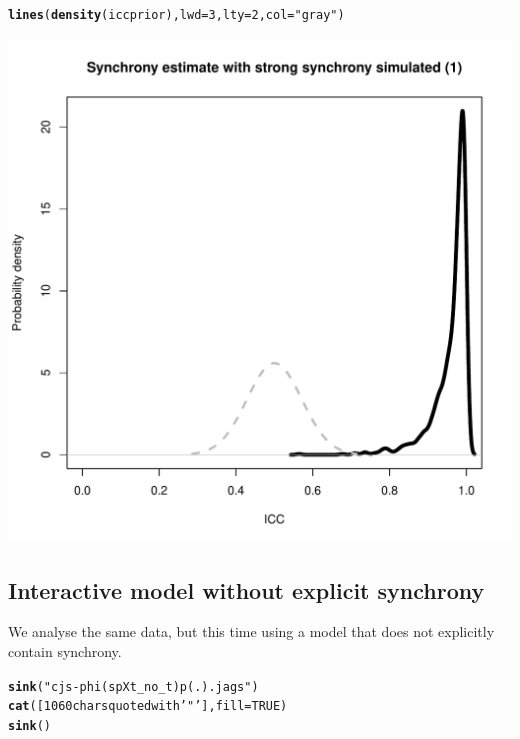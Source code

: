 \documentclass[a4paper, 10pt]{scrartcl}\usepackage[]{graphicx}\usepackage[]{color}
\makeatletter
\def\maxwidth{ %
  \ifdim\Gin@nat@width>\linewidth
    \linewidth
  \else
    \Gin@nat@width
  \fi
}
\newcommand{\hlnum}[1]{\textcolor[rgb]{0.686,0.059,0.569}{#1}}%
\newcommand{\hlstr}[1]{\textcolor[rgb]{0.192,0.494,0.8}{#1}}%
\newcommand{\hlstd}[1]{\textcolor[rgb]{0.345,0.345,0.345}{#1}}%
\newcommand{\hlkwc}[1]{\textcolor[rgb]{0.333,0.667,0.333}{#1}}%
\newcommand{\hlkwd}[1]{\textcolor[rgb]{0.737,0.353,0.396}{\textbf{#1}}}%
\newenvironment{kframe}{%
 \def\at@end@of@kframe{}%
 \ifinner\ifhmode%
  \def\at@end@of@kframe{\end{minipage}}%
  \begin{minipage}{\columnwidth}%
 \fi\fi%
 \def\FrameCommand##1{\hskip\@totalleftmargin \hskip-\fboxsep
 \colorbox{shadecolor}{##1}\hskip-\fboxsep
     \hskip-\linewidth \hskip-\@totalleftmargin \hskip\columnwidth}%
 \MakeFramed {\advance\hsize-\width
   \@totalleftmargin\z@ \linewidth\hsize
   \@setminipage}}%
 {\par\unskip\endMakeFramed%
 \at@end@of@kframe}
\newenvironment{knitrout}{}{} %
\makeatother
\begin{document}
\begin{knitrout}
\begin{kframe}
\begin{alltt}
\hlkwd{lines}\hlstd{(}\hlkwd{density}\hlstd{(iccprior),} \hlkwc{lwd}\hlstd{=}\hlnum{3}\hlstd{,} \hlkwc{lty}\hlstd{=}\hlnum{2}\hlstd{,} \hlkwc{col}\hlstd{=}\hlstr{"gray"}\hlstd{)}
\end{alltt}
\end{kframe}
\includegraphics[width=\maxwidth]{figure/unnamed-chunk-11-2} 

\end{knitrout}

\subsection{Interactive model without explicit synchrony}
We analyse the same data, but this time using a model that does not explicitly contain synchrony.

\begin{knitrout}
\color{fgcolor}\begin{kframe}
\begin{alltt}
\hlkwd{sink}\hlstd{(}\hlstr{"cjs-phi(spXt_no_t)p(.).jags"}\hlstd{)}
\hlkwd{cat}\hlstd{(}\hlstr{[1060 chars quoted with '"']}\hlstd{,}\hlkwc{fill} \hlstd{=} \hlnum{TRUE}\hlstd{)}
\hlkwd{sink}\hlstd{()}
\end{alltt}
\end{kframe}
\end{knitrout}
\end{document}
